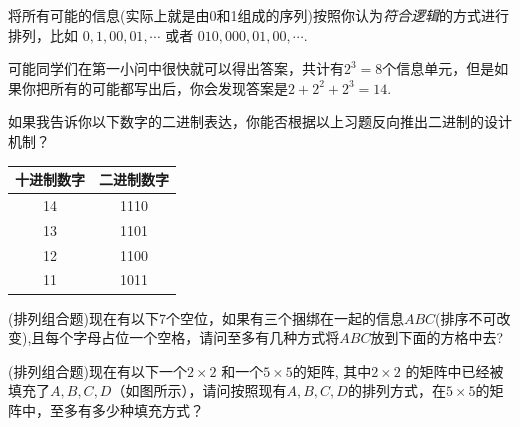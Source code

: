 \documentclass[12pt]{article}
\numberwithin{figure}{section}
\numberwithin{equation}{section}
\newenvironment{question}[2][Question]{\begin{trivlist}
\item[\hskip \labelsep {\bfseries #1}\hskip \labelsep {\bfseries #2.}]}{\end{trivlist}}
\begin{document}
\begin{question}{C1-Q2}
	将所有可能的信息(实际上就是由0和1组成的序列)按照你认为\textit{符合逻辑}的方式进行排列，比如 $0, 1, 00, 01, \cdots$ 或者 $010, 000, 01, 00,\cdots$. 
\end{question}


\begin{question}{C1-Q3}
	可能同学们在第一小问中很快就可以得出答案，共计有$2^3=8$个信息单元，但是如果你把所有的可能都写出后，你会发现答案是$2+2^2+2^3=14$.
\end{question}

\begin{remark}
如果我告诉你以下数字的二进制表达，你能否根据以上习题反向推出二进制的设计机制？
\end{remark}
\begin{table}[H]
	\centering
	\renewcommand{\arraystretch}{1.5}
	\begin{tabular}{cc}
	\hline 
		十进制数字 & 二进制数字 \\
		\hline 
		14 & 1110\\
		13 & 1101 \\
		12 & 1100 \\
		11 & 1011 \\
		\hline 
	\end{tabular}
\end{table}	

\begin{question}{C1-Q4}
	(排列组合题)现在有以下7个空位，如果有三个捆绑在一起的信息$ABC$(排序不可改变),且每个字母占位一个空格，请问至多有几种方式将$ABC$放到下面的方格中去?
		\begin{figure}[H]
		\centering
	\end{figure}
\end{question}

\begin{question}{C1-Q4}
(排列组合题)现在有以下一个$2\times 2$ 和一个$5\times 5$的矩阵, 其中$2\times 2$ 的矩阵中已经被填充了$A,B,C,D$（如图所示），请问按照现有$A,B, C, D$的排列方式，在$5 \times 5$的矩阵中，至多有多少种填充方式？
		\begin{figure}[H]
		\centering
		\begin{subfigure}[b]{0.45\textwidth}
			\centering
		\end{subfigure}
		\begin{subfigure}[b]{0.45\textwidth}
			\centering
		\end{subfigure}
	\end{figure}	
\end{question}
\end{document}
